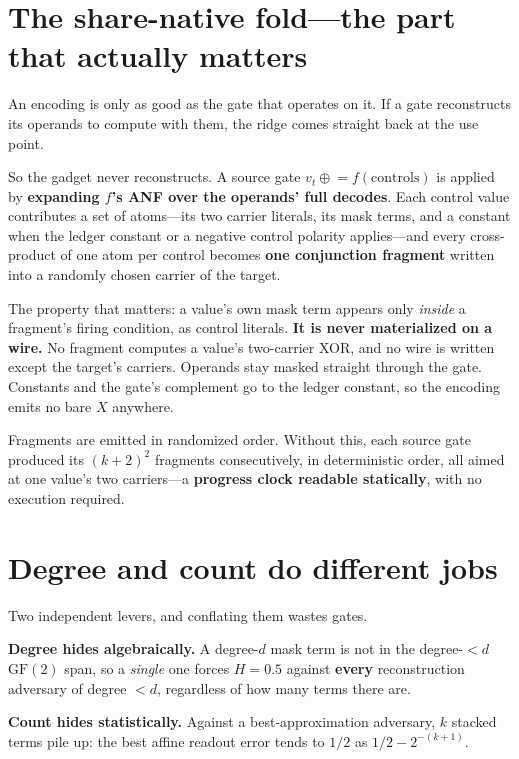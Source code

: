 \documentclass[11pt]{article}
\newcommand{\xor}{\oplus}
\begin{document}
\section{The share-native fold---the part that actually matters}

An encoding is only as good as the gate that operates on it. If a gate
reconstructs its operands to compute with them, the ridge comes straight back at
the use point.

So the gadget never reconstructs. A source gate $v_t \mathrel{\xor}= f(\text{controls})$
is applied by \textbf{expanding $f$'s ANF over the operands' full decodes}. Each
control value contributes a set of atoms---its two carrier literals, its mask
terms, and a constant when the ledger constant or a negative control polarity
applies---and every cross-product of one atom per control becomes \textbf{one
conjunction fragment} written into a randomly chosen carrier of the target.

The property that matters: a value's own mask term appears only \emph{inside} a
fragment's firing condition, as control literals. \textbf{It is never
materialized on a wire.} No fragment computes a value's two-carrier XOR, and no
wire is written except the target's carriers. Operands stay masked straight
through the gate. Constants and the gate's complement go to the ledger constant,
so the encoding emits no bare $X$ anywhere.

Fragments are emitted in randomized order. Without this, each source gate
produced its $(k+2)^2$ fragments consecutively, in deterministic order, all
aimed at one value's two carriers---a \textbf{progress clock readable
statically}, with no execution required.

\section{Degree and count do different jobs}

Two independent levers, and conflating them wastes gates.

\textbf{Degree hides algebraically.} A degree-$d$ mask term is not in the
degree-$<d$ $\mathrm{GF}(2)$ span, so a \emph{single} one forces $H=0.5$ against
\textbf{every} reconstruction adversary of degree $<d$, regardless of how many
terms there are.

\textbf{Count hides statistically.} Against a best-approximation adversary, $k$
stacked terms pile up: the best affine readout error tends to $1/2$ as
$1/2-2^{-(k+1)}$.
\end{document}
